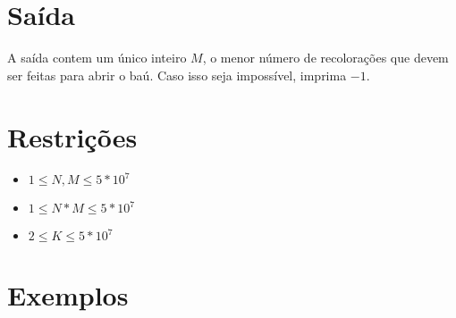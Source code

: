 \section*{Saída}

A saída contem um único inteiro $M$, o menor número de recolorações que devem ser feitas para abrir o baú.
Caso isso seja impossível, imprima $-1$.

\section*{Restrições}

\begin{itemize}
\item $1 \leq N, M \leq 5 * 10^7$
\item $1 \leq N*M \leq 5 * 10^7$
\item $2 \leq K \leq 5*10^7$
\end{itemize}


\section*{Exemplos}

\exemplo
